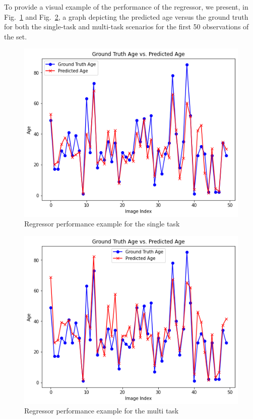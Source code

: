 To provide a visual example of the performance of the regressor,
we present, in Fig.~\ref{8reg} and Fig.~\ref{9reg},
a graph depicting the predicted age versus the ground truth
for both the single-task and multi-task scenarios for the first
50 observations of the set.
\begin{figure}[htbp]
    \centerline{\includegraphics[width=.45\textwidth]{images/testing/reg_single.png}}
    \caption{Regressor performance example for the single task}
    \label{8reg}
\end{figure}
\begin{figure}[htbp]
    \centerline{\includegraphics[width=.45\textwidth]{images/testing/reg_multi.png}}
    \caption{Regressor performance example for the multi task}
    \label{9reg}
\end{figure}